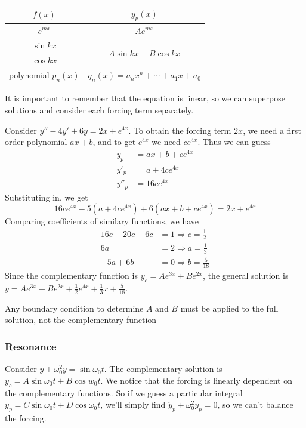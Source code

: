 \documentclass[a4paper]{article}
\begin{document}
\vspace{4pt}
\noindent
\begin{tabular}{cc}
  \toprule
  $f(x)$ & $y_p(x)$\\
  \midrule
  $e^{mx}$ & $Ae^{mx}$\\
  $\sin kx$ & \multirow{2}{*}{$A\sin kx + B\cos kx$}\\
  $\cos kx$ & \\
  polynomial $p_n(x)$ & $q_n(x) = a_nx^n + \cdots + a_1x + a_0$\\
  \bottomrule
\end{tabular}
\vspace{4pt}

It is important to remember that the equation is linear, so we can superpose solutions and consider each forcing term separately.

\begin{eg}
  Consider $y'' - 4y' + 6y = 2x + e^{4x}$. To obtain the forcing term $2x$, we need a first order polynomial $ax + b$, and to get $e^{4x}$ we need $ce^{4x}$. Thus we can guess
  \begin{align*}
    y_p &= ax + b + ce^{4x}\\
    y'_p &= a + 4ce^{4x}\\
    y''_p &= 16ce^{4x}
  \end{align*}
  Substituting in, we get
  \[
  16ce^{4x} - 5(a + 4ce^{4x}) + 6(ax + b + ce^{4x}) = 2x + e^{4x}
  \]
  Comparing coefficients of similary functions, we have
  \begin{align*}
    16c - 20c + 6c &= 1\Rightarrow c = \frac{1}{2}\\
    6a &= 2 \Rightarrow a = \frac{1}{3}\\
    -5a + 6b &= 0 \Rightarrow b = \frac{5}{18}
  \end{align*}
  Since the complementary function is $y_c = Ae^{3x} + Be^{2x}$, the general solution is $y = Ae^{3x} + Be^{2x} + \frac{1}{2}e^{4x} + \frac{1}{3}x + \frac{5}{18}$.

\note Any boundary condition to determine $A$ and $B$ must be applied to the full solution, not the complementary function
\end{eg}
\subsubsection{Resonance}
Consider $\ddot y + \omega_0^2 y = \sin \omega_0 t$. The complementary solution is $y_c = A\sin \omega_0 t + B\cos w_0 t$. We notice that the forcing is linearly dependent on the complementary functions. So if we guess a particular integral $y_p = C\sin \omega_0 t + D\cos \omega_0 t$, we'll simply find $\ddot y_p + \omega_0 ^2 y_p = 0$, so we can't balance the forcing.
\end{document}
